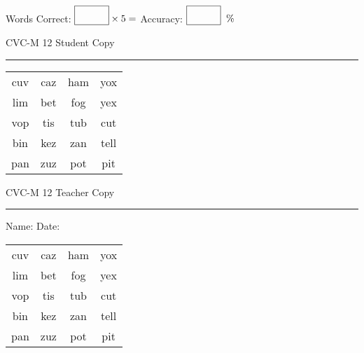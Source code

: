 \documentclass{memoir}
\begin{document}
\small

Words Correct: $\fbox{\phantom{\huge 100}} \times 5 = $ Accuracy: $\fbox{\phantom{\huge 100}}\;\; \%$ 

\vfill

\newpage


\footnotesize \noindent
CVC-M 12 \hfill Student Copy
\smallskip
\hrule

\Large

\setlength{\tabcolsep}{14pt}
\def\arraystretch{2}

{\selectfont


\begin{vplace}[0.5]
\begin{center}
\begin{tabular}{cccc}
cuv & caz & ham & yox \\
lim & bet & fog & yex \\
vop & tis & tub & cut \\
bin & kez & zan & tell \\
pan & zuz & pot & pit \\
\end{tabular}
\end{center}
\end{vplace}

}

\newpage

\footnotesize \noindent
CVC-M 12 \hfill Teacher Copy
\smallskip
\hrule

\small

\vfill

\noindent
Name: \underline{\hspace{1.75in}} \hfill Date: \underline{\hspace{1in}}

\Large

{\selectfont


\begin{vplace}[0.5]
\begin{center}
\begin{tabular}{cccc}
cuv & caz & ham & yox \\
lim & bet & fog & yex \\
vop & tis & tub & cut \\
bin & kez & zan & tell \\
pan & zuz & pot & pit \\
\end{tabular}
\end{center}
\end{vplace}



}
\end{document}
